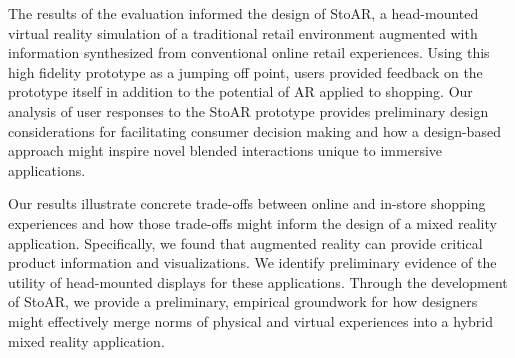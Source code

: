 The results of the evaluation informed the design of StoAR, a head-mounted virtual reality simulation of a traditional retail environment augmented with information synthesized from conventional online retail experiences. Using this high fidelity prototype as a jumping off point, users provided feedback on the prototype itself in addition to the potential of AR applied to shopping. Our analysis of user responses to the StoAR prototype provides preliminary design considerations for facilitating consumer decision making and how a design-based approach might inspire novel blended interactions unique to immersive applications.

Our results illustrate concrete trade-offs between online and in-store shopping experiences and how those trade-offs might inform the design of a mixed reality application. Specifically, we found that augmented reality can provide critical product information and visualizations. We identify preliminary evidence of the utility of head-mounted displays for these applications. Through the development of StoAR, we provide a preliminary, empirical groundwork for how designers might effectively merge norms of physical and virtual experiences into a hybrid mixed reality application.



